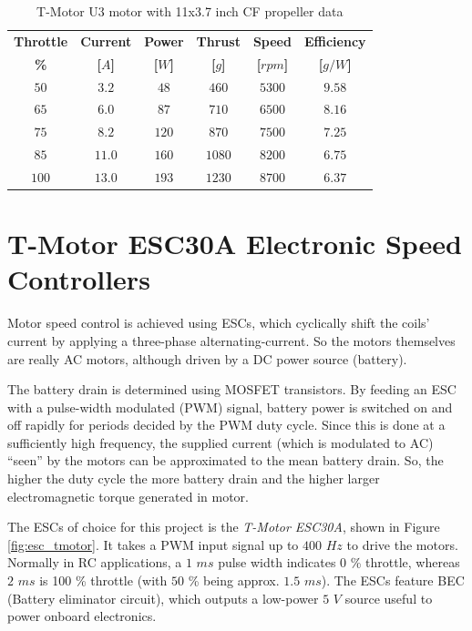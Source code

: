 \documentclass[a4paper]{report}
\begin{document}
\begin{table}
\begin{tabular}{ |c|c|c|c|c|c| } 
\hline
\textbf{Throttle} & \textbf{Current} & \textbf{Power} & \textbf{Thrust} & \textbf{Speed} & \textbf{Efficiency} \\
\textbf{\%} & \textbf{[$A$]} & \textbf{[$W$]} & \textbf{[$g$]} & \textbf{[$rpm$]} & \textbf{[$g/W$]} \\
\hline
$50$ & $3.2$ & $48$ & $460$ & $5300$ & $9.58$ \\ 
$65$ & $6.0$ & $87$ & $710$ & $6500$ & $8.16$ \\ 
$75$ & $8.2$ & $120$ & $870$ & $7500$ & $7.25$ \\ 
$85$ & $11.0$ & $160$ & $1080$ & $8200$ & $6.75$ \\ 
$100$ & $13.0$ & $193$ & $1230$ & $8700$ & $6.37$ \\
\hline
\end{tabular}
\caption{T-Motor U3 motor with 11x3.7 inch CF propeller data}
\label{table:motorManufacturerData}
\end{table}

	\section{T-Motor ESC30A Electronic Speed Controllers}
Motor speed control is achieved using ESCs, which cyclically shift the coils’ current by applying a three-phase alternating-current. So the motors themselves are really AC motors, although driven by a DC power source (battery).

The battery drain is determined using MOSFET transistors. By feeding an ESC with a pulse-width modulated (PWM) signal, battery power is switched on and off rapidly for periods decided by the PWM duty cycle. Since this is done at a sufficiently high frequency, the supplied current (which is modulated to AC) “seen” by the motors can be approximated to the mean battery drain. So, the higher the duty cycle the more battery drain and the higher larger electromagnetic torque generated in motor. 
 
The ESCs of choice for this project is the \emph{T-Motor ESC30A}, shown in Figure \ref{fig:esc_tmotor}. It takes a PWM input signal up to $400$ $Hz$ to drive the motors. Normally in RC applications, a $1$ $ms$ pulse width indicates $0$ \% throttle, whereas $2$ $ms$ is 100 \% throttle (with $50$ \% being approx. $1.5$ $ms$). The ESCs feature BEC (Battery eliminator circuit), which outputs a low-power $5$ $V$ source useful to power onboard electronics.
\end{document}
